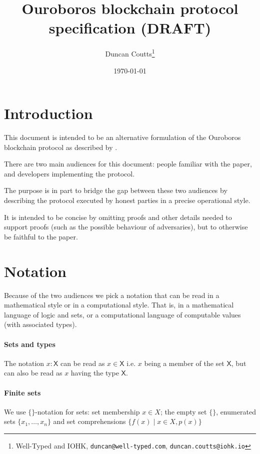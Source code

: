 \documentclass[12pt]{article}
\newcommand{\where}{\mathrel{|}}
\begin{document}
\title{Ouroboros blockchain protocol specification (DRAFT)}
\author{Duncan Coutts\footnote{Well-Typed and IOHK, \texttt{duncan@well-typed.com}, \texttt{duncan.coutts@iohk.io}}}
\date{\today}

\maketitle

\section{Introduction}

This document is intended to be an alternative formulation of the Ouroboros
blockchain protocol as described by \cite{ouroboros}.

There are two main audiences for this document: people familiar with the paper,
and developers implementing the protocol.

The purpose is in part to bridge the gap between these two audiences by
describing the protocol executed by honest parties in a precise operational
style.

It is intended to be concise by omitting proofs and other details needed to
support proofs (such as the possible behaviour of adversaries), but to
otherwise be faithful to the paper.

\section{Notation}

Because of the two audiences we pick a notation that can be read in a
mathematical style or in a computational style. That is, in a mathematical
language of logic and sets, or a computational language of computable values
(with associated types).

\paragraph{Sets and types}
The notation $x : \mathsf{X}$ can be read as $x \in \mathsf{X}$ i.e. $x$ being
a member of the set $\mathsf{X}$, but can also be read as $x$ having the type
$\mathsf{X}$.

\paragraph{Finite sets}
We use $\{\}$-notation for sets: set membership $x \in X$; the empty set $\{\}$, enumerated sets $\{x_1, \ldots, x_n\}$ and set comprehensions
$\{ f(x) \where x \in X, p(x) \}$
\end{document}
